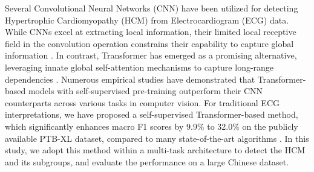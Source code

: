 \documentclass[11pt]{article}
\theoremstyle{definition}
\begin{document}
Several Convolutional Neural Networks (CNN) have been utilized for detecting Hypertrophic Cardiomyopathy (HCM) from Electrocardiogram (ECG) data. While CNNs excel at extracting local information, their limited local receptive field in the convolution operation constrains their capability to capture global information \citep{song2022ctmfnet, yang2021transformer}. In contrast, Transformer has emerged as a promising alternative, leveraging innate global self-attention mechanisms to capture long-range dependencies \citep{vaswani2017attention, dosovitskiy2020image}. Numerous empirical studies have demonstrated that Transformer-based models with self-supervised pre-training outperform their CNN counterparts across various tasks in computer vision\citep{matsoukas2021time}. For traditional ECG interpretations, we have proposed a self-supervised Transformer-based method, which significantly enhances macro F1 scores by 9.9\% to 32.0\% on the publicly available PTB-XL dataset, compared to many state-of-the-art algorithms \citep{wagner2020ptb, zhou2023masked}. 
In this study, we adopt this method within a multi-task architecture to detect the HCM and its subgroups, and evaluate the performance on a large Chinese dataset. 




%
\end{document}
